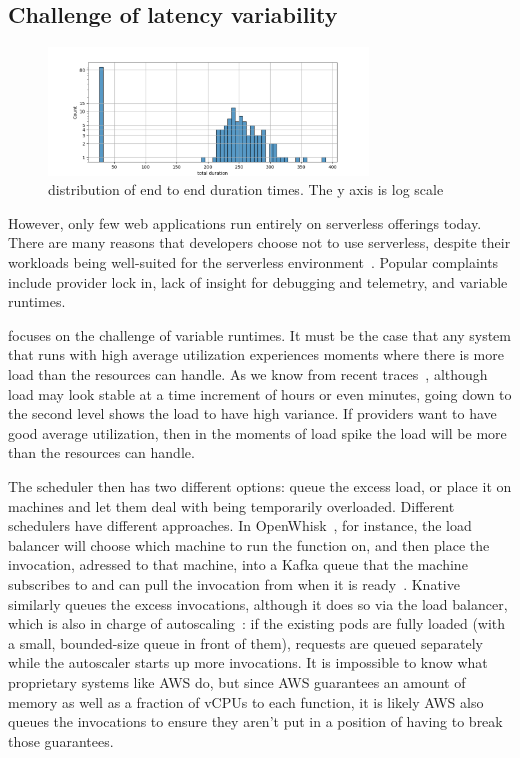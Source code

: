 \subsection{Challenge of latency variability}


\begin{figure}[t!]
    \centering
      \includegraphics[width=8.5cm]{img/lambda_total_durations.png}
      \caption{ distribution of end to end duration times. The y axis is log scale }
    \label{fig:lambda-total-durations}
\end{figure}

However, only few web applications run entirely on serverless offerings today.
There are many reasons that developers choose not to use serverless, despite
their workloads being well-suited for the serverless
environment~\cite{not-lambda-blog,reddit-serverless2}. Popular complaints
include provider lock in, lack of insight for debugging and telemetry, and
variable runtimes.


\Sys{} focuses on the challenge of variable runtimes. It must be the case that
any system that runs with high average utilization experiences moments where
there is more load than the resources can handle. As we know from recent
traces~\cite{prequal}, although load may look stable at a time increment of
hours or even minutes, going down to the second level shows the load to have
high variance. If providers want to have good average utilization, then in the
moments of load spike the load will be more than the resources can handle.

The scheduler then has two different options: queue the excess load, or place it
on machines and let them deal with being temporarily overloaded. Different
schedulers have different approaches. In OpenWhisk~\cite{openwhisk}, for
instance, the load balancer will choose which machine to run the function on,
and then place the invocation, adressed to that machine, into a Kafka queue that
the machine subscribes to and can pull the invocation from when it is
ready~\cite{openwhisk-sched}. Knative~\cite{knative} similarly queues the excess
invocations, although it does so via the load balancer, which is also in charge
of autoscaling~\cite{knative-sched}: if the existing pods are fully loaded (with
a small, bounded-size queue in front of them), requests are queued separately
while the autoscaler starts up more invocations. It is impossible to know what proprietary
systems like AWS do, but since AWS guarantees an amount of memory as well as a
fraction of vCPUs to each function, it is likely AWS also queues the invocations
to ensure they aren't put in a position of having to break those
guarantees. 

